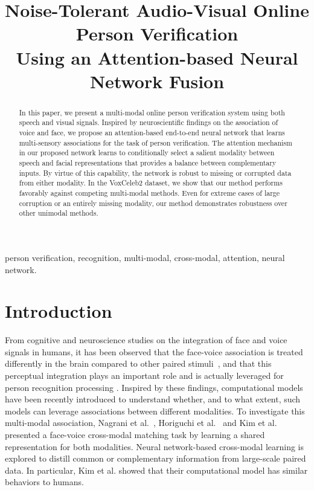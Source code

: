 \documentclass{article}
\title{Noise-Tolerant Audio-Visual Online Person Verification\\ Using an Attention-based Neural Network Fusion\\
}
\begin{document}
\ninept
\maketitle
\begin{abstract}
In this paper, we present a multi-modal online person verification system using both speech and visual signals. Inspired by neuroscientific findings on the association of voice and face, we propose an attention-based end-to-end neural network that learns multi-sensory associations for the task of person verification. The attention mechanism in our proposed network learns to conditionally select a salient modality between speech and facial representations that provides a balance between complementary inputs. By virtue of this capability, the network is robust to missing or corrupted data from either modality. In the VoxCeleb2 dataset, we show that our method performs favorably against competing multi-modal methods. Even for extreme cases of large corruption or an entirely missing modality, our method demonstrates robustness over other unimodal methods.
\end{abstract}
\begin{keywords}
person verification, recognition, multi-modal, cross-modal, attention, neural network.
\end{keywords}
\section{Introduction}
\label{sec:intro}

From cognitive and neuroscience studies on the integration of face and voice signals in humans, it has been observed that the face-voice association is treated differently in the brain compared to other paired stimuli~\cite{von2006implicit}, and that this perceptual integration plays an important role and is actually leveraged for person recognition processing \cite{hasan2016hearing}.    
Inspired by these findings, computational models have been recently introduced to understand whether, and to what extent, such models can leverage associations between different modalities.
To investigate this multi-modal association, Nagrani et al.~\cite{nagrani2018seeing}, Horiguchi et al.~\cite{horiguchi2018face} and Kim et al.~\cite{kim2018learning} presented a face-voice cross-modal matching task by learning a shared representation for both modalities.
Neural network-based cross-modal learning is explored to distill common or complementary information from large-scale paired data.
In particular, Kim et al. showed that their computational model has similar behaviors to humans.
\end{document}
